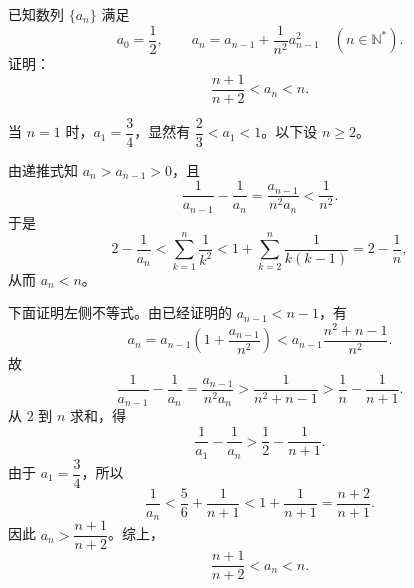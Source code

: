 \begin{question}[points=12]
已知数列 $\{a_n\}$ 满足
\[
 a_0=\frac12,\qquad a_n=a_{n-1}+\frac1{n^2}a_{n-1}^2\quad(n\in\mathbb N^*).
\]
证明：
\[
 \frac{n+1}{n+2}<a_n<n.
\]
\begin{solution}
当 $n=1$ 时，$a_1=\dfrac34$，显然有 $\dfrac23<a_1<1$。以下设 $n\ge2$。

由递推式知 $a_n>a_{n-1}>0$，且
\[
 \frac1{a_{n-1}}-\frac1{a_n}
 =\frac{a_{n-1}}{n^2a_n}<\frac1{n^2}.
\]
于是
\[
 2-\frac1{a_n}
 <\sum_{k=1}^{n}\frac1{k^2}
 <1+\sum_{k=2}^{n}\frac1{k(k-1)}
 =2-\frac1n,
\]
从而 $a_n<n$。

下面证明左侧不等式。由已经证明的 $a_{n-1}<n-1$，有
\[
 a_n=a_{n-1}\left(1+\frac{a_{n-1}}{n^2}\right)
 <a_{n-1}\frac{n^2+n-1}{n^2}.
\]
故
\[
 \frac1{a_{n-1}}-\frac1{a_n}
 =\frac{a_{n-1}}{n^2a_n}
 >\frac1{n^2+n-1}
 >\frac1n-\frac1{n+1}.
\]
从 $2$ 到 $n$ 求和，得
\[
 \frac1{a_1}-\frac1{a_n}>\frac12-\frac1{n+1}.
\]
由于 $a_1=\dfrac34$，所以
\[
 \frac1{a_n}<\frac56+\frac1{n+1}<1+\frac1{n+1}=\frac{n+2}{n+1}.
\]
因此 $a_n>\dfrac{n+1}{n+2}$。综上，
\[
 \boxed{\dfrac{n+1}{n+2}<a_n<n}.
\]
\end{solution}
\end{question}


